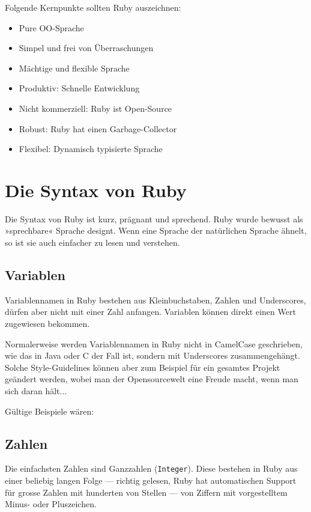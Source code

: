 \documentclass[a4book,11pt,twoside]{scrbook}
\begin{document}
Folgende Kernpunkte sollten Ruby auszeichnen:
\begin{itemize}
	\item Pure OO-Sprache
	\item Simpel und frei von Überraschungen
	\item Mächtige und flexible Sprache
	\item Produktiv: Schnelle Entwicklung
	\item Nicht kommerziell: Ruby ist Open-Source
	\item Robust: Ruby hat einen Garbage-Collector
	\item Flexibel: Dynamisch typisierte Sprache
\end{itemize}







\chapter{Die Syntax von Ruby} %
\label{cha:die_syntax_von_ruby}
Die Syntax von Ruby ist kurz, prägnant und sprechend. Ruby wurde bewusst als »sprechbare« Sprache designt. Wenn eine Sprache der natürlichen Sprache ähnelt, so ist sie auch einfacher zu lesen und verstehen.





\section{Variablen} %
\label{sub:variablen}
Variablennamen in Ruby bestehen aus Kleinbuchstaben, Zahlen und Underscores, dürfen aber nicht mit einer Zahl anfangen. Variablen können direkt einen Wert zugewiesen bekommen.

Normalerweise werden Variablennamen in Ruby nicht in CamelCase geschrieben, wie das in Java oder C der Fall ist, sondern mit Underscores zusammengehängt. Solche Style-Guidelines können aber zum Beispiel für ein gesamtes Projekt geändert werden, wobei man der Opensourcewelt eine Freude macht, wenn man sich daran hält...

Gültige Beispiele wären:







\section{Zahlen} %
\label{sec:zahlen}
Die einfachsten Zahlen sind Ganzzahlen (\texttt{Integer}). Diese bestehen in Ruby aus einer beliebig langen Folge — richtig gelesen, Ruby hat automatischen Support für grosse Zahlen mit hunderten von Stellen — von Ziffern mit vorgestelltem Minus- oder Pluszeichen.
\end{document}
